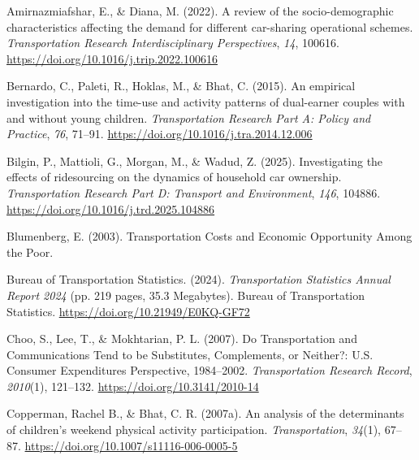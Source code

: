 \documentclass[
]{agujournal2019}
\newlength{\cslhangindent}
\newenvironment{CSLReferences}[2] %
 {\begin{list}{}{%
  \setlength{\itemindent}{0pt}
  \setlength{\leftmargin}{0pt}
  \setlength{\parsep}{0pt}
  \ifodd #1
   \setlength{\leftmargin}{\cslhangindent}
   \setlength{\itemindent}{-1\cslhangindent}
  \fi
  \setlength{\itemsep}{#2\baselineskip}}}
 {\end{list}}
\begin{document}
\protect{}\label{refs}
\begin{CSLReferences}{1}{0}
\vspace{1em}

Amirnazmiafshar, E., \& Diana, M. (2022). A review of the
socio-demographic characteristics affecting the demand for different
car-sharing operational schemes. \emph{Transportation Research
Interdisciplinary Perspectives}, \emph{14}, 100616.
\url{https://doi.org/10.1016/j.trip.2022.100616}

Bernardo, C., Paleti, R., Hoklas, M., \& Bhat, C. (2015). An empirical
investigation into the time-use and activity patterns of dual-earner
couples with and without young children. \emph{Transportation Research
Part A: Policy and Practice}, \emph{76}, 71--91.
\url{https://doi.org/10.1016/j.tra.2014.12.006}

Bilgin, P., Mattioli, G., Morgan, M., \& Wadud, Z. (2025). Investigating
the effects of ridesourcing on the dynamics of household car ownership.
\emph{Transportation Research Part D: Transport and Environment},
\emph{146}, 104886. \url{https://doi.org/10.1016/j.trd.2025.104886}

Blumenberg, E. (2003). Transportation {Costs} and {Economic}
{Opportunity} {Among} the {Poor}.

Bureau of Transportation Statistics. (2024). \emph{Transportation
{Statistics} {Annual} {Report} 2024} (pp. 219 pages, 35.3 Megabytes).
Bureau of Transportation Statistics.
\url{https://doi.org/10.21949/E0KQ-GF72}

Choo, S., Lee, T., \& Mokhtarian, P. L. (2007). Do {Transportation} and
{Communications} {Tend} to be {Substitutes}, {Complements}, or
{Neither}?: {U}.{S}. {Consumer} {Expenditures} {Perspective},
1984--2002. \emph{Transportation Research Record}, \emph{2010}(1),
121--132. \url{https://doi.org/10.3141/2010-14}

Copperman, Rachel B., \& Bhat, C. R. (2007a). An analysis of the
determinants of children's weekend physical activity participation.
\emph{Transportation}, \emph{34}(1), 67--87.
\url{https://doi.org/10.1007/s11116-006-0005-5}


\end{CSLReferences}
\end{document}
